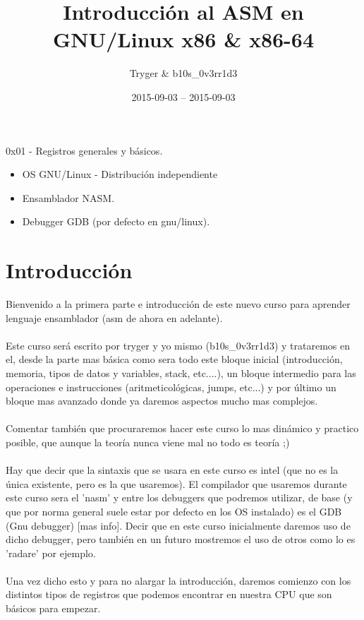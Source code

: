 \documentclass{fennix}
\begin{document}
	\title{Introducción al ASM en GNU/Linux x86 \& x86-64}
	\author{Tryger \& b10s\_0v3rr1d3}
	\date{2015-09-03 -- 2015-09-03}
	\maketitle
\begin{resumen}
	0x01 - Registros generales y básicos.
\end{resumen}

\begin{requisitos}
	\begin{itemize}
		\item OS GNU/Linux - Distribución independiente 
		\item Ensamblador NASM. 
		\item Debugger GDB (por defecto en gnu/linux). 
	\end{itemize}
\end{requisitos}

\section{Introducción}
Bienvenido a la primera parte e introducción de este nuevo curso para aprender lenguaje ensamblador (asm de ahora en adelante).\\
\\
Este curso será escrito por tryger y yo mismo (b10s\_0v3rr1d3) y trataremos en el, desde la parte mas básica como sera todo este bloque inicial (introducción, memoria, tipos de datos y variables, stack, etc....), un bloque intermedio para las operaciones e instrucciones (aritmeticológicas, jumps, etc...) y por último un bloque mas avanzado donde ya daremos aspectos mucho mas complejos.\\
\\
Comentar también que procuraremos hacer este curso lo mas dinámico y practico posible, que aunque la teoría nunca viene mal no todo es teoría ;)\\
\\
Hay que decir que la sintaxis que se usara en este curso es intel (que no es la única existente, pero es la que usaremos).
El compilador que usaremos durante este curso sera el 'nasm' y entre los debuggers que podremos utilizar, de base (y que por norma general suele estar por defecto en los OS instalado) es el GDB (Gnu debugger) [mas info].
Decir que en este curso inicialmente daremos uso de dicho debugger, pero también en un futuro mostremos el uso de otros como lo es 'radare' por ejemplo.\\
\\
Una vez dicho esto y para no alargar la introducción, daremos comienzo con los distintos tipos de registros que podemos encontrar en nuestra CPU que son básicos para empezar. 
\end{document}
